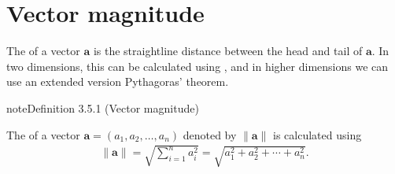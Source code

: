 \documentclass[letterpaper,10pt,english]{jupyterBook}
\let\sphinxpxdimen\pdfpxdimen\else\newdimen\sphinxpxdimen
\begin{document}
\sphinxstepscope

\ignorespaces 

\section{Vector magnitude}
\label{\detokenize{_pages/3.2_Vector_magnitude:vector-magnitude}}\label{\detokenize{_pages/3.2_Vector_magnitude:index-0}}\label{\detokenize{_pages/3.2_Vector_magnitude:vector-magnitude-section}}\label{\detokenize{_pages/3.2_Vector_magnitude::doc}}
\sphinxAtStartPar
The  of a vector \(\mathbf{a}\) is the straight\sphinxhyphen{}line distance between the head and tail of \(\mathbf{a}\). In two dimensions, this can be calculated using , and in higher dimensions we can use an extended version Pythagoras’ theorem.
\label{_pages/3.2_Vector_magnitude:magnitude-definition}
\begin{sphinxadmonition}{note}{Definition 3.5.1 (Vector magnitude)}



\sphinxAtStartPar
The  of a vector \(\mathbf{a} = (a_1, a_2, \ldots, a_n)\) denoted by \(\|\mathbf{a}\|\) is calculated using
\begin{equation}\label{equation:_pages/3.2_Vector_magnitude:magnitude-equation}
\begin{split} \|\mathbf{a}\| = \sqrt{\sum_{i=1}^n a_i^2} = \sqrt{a_1^2 + a_2^2 + \cdots + a_n^2}. \end{split}
\end{equation}
\begin{figure}[htbp]
\centering

\noindent\sphinxincludegraphics[width=250\sphinxpxdimen]{{3_magnitude}.svg}
\end{figure}
\end{sphinxadmonition}
\end{document}

